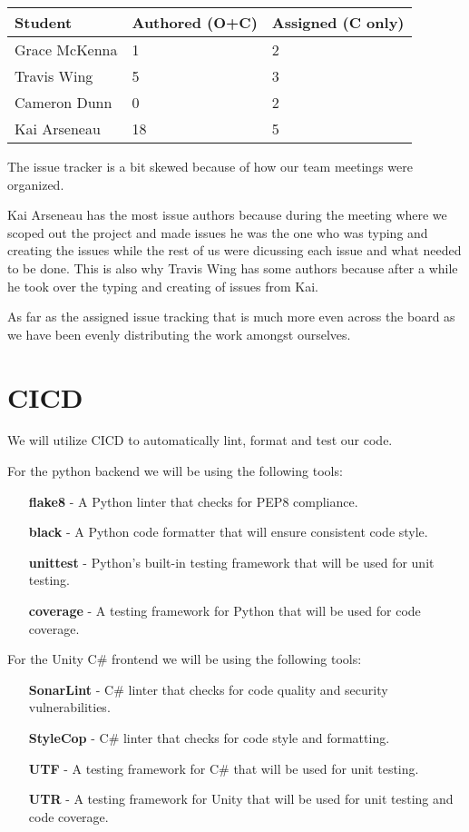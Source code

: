 \documentclass{article}
\begin{document}
\begin{table}[H]
\centering
\begin{tabular}{lll}
\toprule
\textbf{Student} & \textbf{Authored (O+C)} & \textbf{Assigned (C only)}\\
\midrule
Grace McKenna & 1 & 2 \\
Travis Wing & 5 & 3 \\
Cameron Dunn & 0 & 2 \\
Kai Arseneau & 18 & 5 \\
\bottomrule
\end{tabular}
\end{table}

The issue tracker is a bit skewed because of how our team meetings were organized.

Kai Arseneau has the most issue authors because during the meeting where we scoped out the project and made issues
he was the one who was typing and creating the issues while the rest of us were dicussing each issue and what needed to be done.
This is also why Travis Wing has some authors because after a while he took over the typing and creating of issues from Kai.

As far as the assigned issue tracking that is much more even across the board as we have been evenly distributing the work amongst ourselves.


\section{CICD}

We will utilize CICD to automatically lint, format and test our code. 

For the python backend we will be using the following tools:
\begin{itemize}
  \item [\textbf{flake8}] - A Python linter that checks for PEP8 compliance.
  \item [\textbf{black}] - A Python code formatter that will ensure consistent code style.
  \item [\textbf{unittest}] - Python's built-in testing framework that will be used for unit testing.
  \item [\textbf{coverage}] - A testing framework for Python that will be used for code coverage.
\end{itemize}

\bigskip
\noindent For the Unity C\# frontend we will be using the following tools:
\begin{itemize}
  \item [\textbf{SonarLint}] - C\# linter that checks for code quality and security vulnerabilities.
  \item [\textbf{StyleCop}] - C\# linter that checks for code style and formatting.
  \item [\textbf{UTF}] - A testing framework for C\# that will be used for unit testing.
  \item [\textbf{UTR}] - A testing framework for Unity that will be used for unit testing and code coverage.
\end{itemize}
\end{document}
